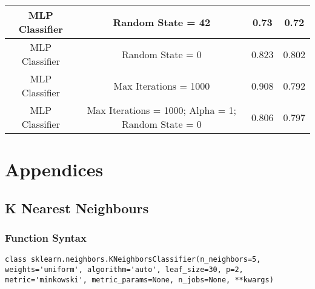 \documentclass[12pt]{article}
\begin{document}
{\begin{landscape}
\begin{table}[]
\begin{tabular}{|c|c|c|c|}
MLP Classifier         & Random State = 42                                  & 0.73               & 0.72              \\ \hline
MLP Classifier         & Random State = 0                                   & 0.823              & 0.802             \\ \hline
MLP Classifier         & Max Iterations = 1000                              & 0.908              & 0.792             \\ \hline
MLP Classifier         & Max Iterations = 1000; Alpha = 1; Random State = 0 & 0.806              & 0.797             \\ \hline
\end{tabular}
\end{table}
\label{table:2}
\end{landscape}
\clearpage
}

\newpage
\section{Appendices}
\subsection{K Nearest Neighbours}
\subsubsection{Function Syntax}
\begin{lstlisting}
class sklearn.neighbors.KNeighborsClassifier(n_neighbors=5, weights='uniform', algorithm='auto', leaf_size=30, p=2, metric='minkowski', metric_params=None, n_jobs=None, **kwargs)
\end{lstlisting}
\end{document}
